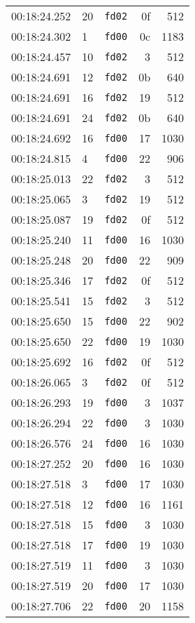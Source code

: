 \documentclass{article}
\begin{document}
\begin{longtable}{lllrr}
00:18:24.252 & 20 & \texttt{fd02} & 0f & 512 \\
00:18:24.302 & 1 & \texttt{fd00} & 0c & 1183 \\
00:18:24.457 & 10 & \texttt{fd02} & 3 & 512 \\
00:18:24.691 & 12 & \texttt{fd02} & 0b & 640 \\
00:18:24.691 & 16 & \texttt{fd02} & 19 & 512 \\
00:18:24.691 & 24 & \texttt{fd02} & 0b & 640 \\
00:18:24.692 & 16 & \texttt{fd00} & 17 & 1030 \\
00:18:24.815 & 4 & \texttt{fd00} & 22 & 906 \\
00:18:25.013 & 22 & \texttt{fd02} & 3 & 512 \\
00:18:25.065 & 3 & \texttt{fd02} & 19 & 512 \\
00:18:25.087 & 19 & \texttt{fd02} & 0f & 512 \\
00:18:25.240 & 11 & \texttt{fd00} & 16 & 1030 \\
00:18:25.248 & 20 & \texttt{fd00} & 22 & 909 \\
00:18:25.346 & 17 & \texttt{fd02} & 0f & 512 \\
00:18:25.541 & 15 & \texttt{fd02} & 3 & 512 \\
00:18:25.650 & 15 & \texttt{fd00} & 22 & 902 \\
00:18:25.650 & 22 & \texttt{fd00} & 19 & 1030 \\
00:18:25.692 & 16 & \texttt{fd02} & 0f & 512 \\
00:18:26.065 & 3 & \texttt{fd02} & 0f & 512 \\
00:18:26.293 & 19 & \texttt{fd00} & 3 & 1037 \\
00:18:26.294 & 22 & \texttt{fd00} & 3 & 1030 \\
00:18:26.576 & 24 & \texttt{fd00} & 16 & 1030 \\
00:18:27.252 & 20 & \texttt{fd00} & 16 & 1030 \\
00:18:27.518 & 3 & \texttt{fd00} & 17 & 1030 \\
00:18:27.518 & 12 & \texttt{fd00} & 16 & 1161 \\
00:18:27.518 & 15 & \texttt{fd00} & 3 & 1030 \\
00:18:27.518 & 17 & \texttt{fd00} & 19 & 1030 \\
00:18:27.519 & 11 & \texttt{fd00} & 3 & 1030 \\
00:18:27.519 & 20 & \texttt{fd00} & 17 & 1030 \\
00:18:27.706 & 22 & \texttt{fd00} & 20 & 1158 \\

\end{longtable}
\end{document}
